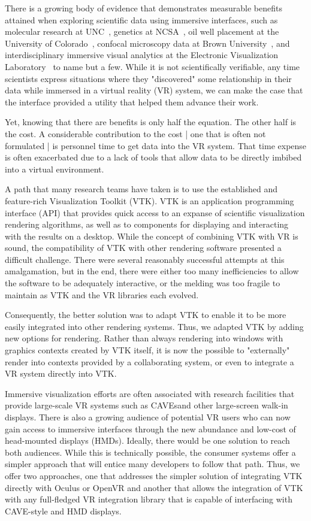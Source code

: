 There is a growing body of evidence that demonstrates measurable benefits
attained when exploring scientific data using immersive interfaces, such as
molecular research at UNC~\cite{Brooks:1990},
genetics at NCSA~\cite{Brady:1995},
oil well placement at the University of Colorado~\cite{Gruchalla:2004},  confocal microscopy data at Brown University~\cite{Prabhat:2008}, and interdisciplinary immersive visual analytics at the Electronic Visualization Laboratory~\cite{Marai:2016} to name but a few.
While it is not scientifically verifiable, any time scientists
express situations where they "discovered" some relationship in their data
while immersed in a virtual reality (VR) system, we can make the case that the
interface provided a utility that helped them advance their work.

Yet, knowing that there are benefits is only half the equation.
The other half is the cost.
A considerable contribution to the cost | one that is often not
formulated | is personnel time to get data into the VR system.
That time expense is often exacerbated due to a lack of tools that
allow data to be directly imbibed into a virtual environment.

A path that many research teams have taken is to use the established and
feature-rich Visualization Toolkit (VTK).
VTK is an application programming interface (API) that provides quick access to an expanse
of scientific visualization rendering algorithms, as well as to components
for displaying and interacting with the results on a desktop.
While the concept of combining VTK with VR is sound, the
compatibility of VTK with other rendering software presented a difficult
challenge.  
There were several reasonably successful attempts at this amalgamation,
but in the end, there were either too many inefficiencies to allow the
software to be adequately interactive, or the melding was too fragile to
maintain as VTK and the VR libraries each evolved.

Consequently, the better solution was to adapt VTK to enable it to be
more easily integrated into other rendering systems.
Thus, we adapted VTK by adding new options for rendering.
Rather than always rendering into windows with graphics contexts
created by VTK itself, it is now the possible to "externally" render
into contexts provided by a collaborating system, or even to integrate a
VR system directly into VTK.

Immersive visualization efforts are often associated with research
facilities that provide large-scale VR systems such as CAVEs\texttrademark and
other large-screen walk-in displays.
There is also a growing audience of potential VR users who can now
gain access to immersive interfaces through the new abundance and low-cost
of head-mounted displays (HMDs).
Ideally, there would be one solution to reach both audiences. While this is
technically possible, the consumer systems offer a simpler
approach that will entice many developers to follow that path.
Thus, we offer two approaches, one that addresses the simpler solution
of integrating VTK directly with Oculus or OpenVR and another that allows the integration of VTK with
any full-fledged VR integration library that is capable of interfacing
with CAVE-style and HMD displays.

